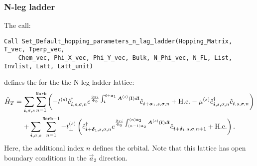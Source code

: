 \subsubsection*{N-leg ladder}
The call:
\begin{lstlisting}[style=fortran]
Call Set_Default_hopping_parameters_n_lag_ladder(Hopping_Matrix, T_vec, Tperp_vec,
    Chem_vec, Phi_X_vec, Phi_Y_vec, Bulk, N_Phi_vec, N_FL, List, Invlist, Latt, Latt_unit)
\end{lstlisting}  
defines  the   for the  the  N-leg ladder lattice:                 
\begin{multline}
\hat{H}_T  =  \sum_{\boldsymbol{i}, \sigma, s }  \sum_{n=1}^{\texttt{Norb}} \left(      - t^{(s)} \hat{c}^{\dagger}_{\boldsymbol{i},s,\sigma,n}   e^{\frac{2 \pi i}{\Phi_0} \int_{\boldsymbol{i}}^{\boldsymbol{i}+ \boldsymbol{a}_1}  \boldsymbol{A}^{(s)}(\boldsymbol{l})  d \boldsymbol{l}}   \hat{c}^{}_{\boldsymbol{i} + \boldsymbol{a}_1,s,\sigma,n} +  \mathrm{H.c.}       -  \mu^{(s)} \hat{c}^{\dagger}_{\boldsymbol{i},s,\sigma,n} \hat{c}^{}_{\boldsymbol{i},s,\sigma,n}  \right)    \\
     + \sum_{\boldsymbol{i}, \sigma, s } \sum_{n=1}^{\texttt{Norb}-1}  -  t_{\perp}^{(s)}  \left( 
                   \hat{c}^{\dagger}_{\boldsymbol{i} + \boldsymbol{\delta}_1,s,\sigma,n}  e^{\frac{2 \pi i}{\Phi_0} \int_{(n-1)\boldsymbol{a}_2}^{(n)\boldsymbol{a}_2}  \boldsymbol{A}^{(s)}(\boldsymbol{l})  d \boldsymbol{l}}    \hat{c}^{}_{\boldsymbol{i} + \boldsymbol{\delta}_1,s,\sigma,n+1}  + \mathrm{H.c.}  \right). 
\end{multline}
Here, the additional  index  $n$  defines  the orbital.  Note that this lattice  has open boundary conditions in the $\vec{a}_2$  direction. 
